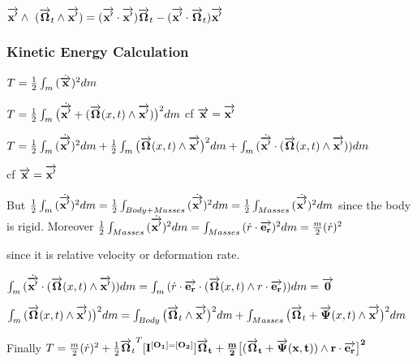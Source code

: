 $\overrightarrow{\bf x'}\wedge\ (\overrightarrow{\bf \Omega}_t \wedge \overrightarrow{\bf x'})=(\overrightarrow{\bf x'} \cdot \overrightarrow{\bf x'})\overrightarrow{\bf \Omega}_t - (\overrightarrow{\bf x'} \cdot \overrightarrow{\bf \Omega}_t)\overrightarrow{\bf x'}$

\subsubsection{Kinetic Energy Calculation}

$T=\frac{1}{2} \int_{m}{(\dot{\overrightarrow{\bf x}})^2dm}$

$T=\frac{1}{2} \int_{m}{\big (\dot{\overrightarrow{\bf x'}}+(\overrightarrow{\bf \Omega}(x,t) \wedge \overrightarrow{\bf x'})\big)^2dm}$ cf $\overrightarrow{\bf x}=\overrightarrow{\bf x'}$

$T=\frac{1}{2} \int_{m}{(\dot{\overrightarrow{\bf x'}})^2dm} +\frac{1}{2} \int_{m}{\big (\overrightarrow{\bf \Omega}(x,t) \wedge \overrightarrow{\bf x'}\big)^2dm}+\int_{m}{(\dot{\overrightarrow{\bf x'}} \cdot(\overrightarrow{\bf \Omega}(x,t) \wedge \overrightarrow{\bf x'}))dm}$ 

cf $\overrightarrow{\bf x}=\overrightarrow{\bf x'}$

But
$\frac{1}{2} \int_{m}{(\dot{\overrightarrow{\bf x'}})^2dm}=\frac{1}{2} \int_{Body+Masses}{(\dot{\overrightarrow{\bf x'}})^2dm}=\frac{1}{2} \int_{Masses}{(\dot{\overrightarrow{\bf x'}})^2dm}$ since the body is rigid. Moreover $\frac{1}{2} \int_{Masses}{(\dot{\overrightarrow{\bf x'}})^2dm}=\int_{Masses}{({\dot r \cdot \overrightarrow{\bf e_r}})^2dm}=\frac{m}{2}(\dot r)^2$ 

since it is relative velocity or deformation rate.

$\int_{m}{(\dot{\overrightarrow{\bf x'}} \cdot(\overrightarrow{\bf \Omega}(x,t) \wedge \overrightarrow{\bf x'}))dm}=\int_{m}{(\dot{r} \cdot \overrightarrow{\bf e_r} \cdot(\overrightarrow{\bf \Omega}(x,t) \wedge r \cdot \overrightarrow{\bf e_r}))dm}=\overrightarrow{\bf 0}$

$\int_{m}{(\overrightarrow{\bf \Omega}(x,t) \wedge \overrightarrow{\bf x'})\big)^2dm}=\int_{Body}{\big (\overrightarrow{\bf \Omega}_t \wedge \overrightarrow{\bf x'}\big)^2dm}+\int_{Masses}{\big (\overrightarrow{\bf \Omega}_t+\overrightarrow{\bf \Psi}(x,t) \wedge \overrightarrow{\bf x'}\big)^2dm}$

Finally
$T=\frac{m}{2}(\dot r)^2+\frac{1}{2}{\overrightarrow{\bf \Omega}_t}^T[\bf I^{[\bf O_1]=[\bf O_2]}]\overrightarrow{\bf \Omega}_t+\frac{m}{2}\big[(\overrightarrow{\bf \Omega}_t+\overrightarrow{\bf \Psi}(x,t)) \wedge r \cdot \overrightarrow{\bf e_r} \big ]^2$


